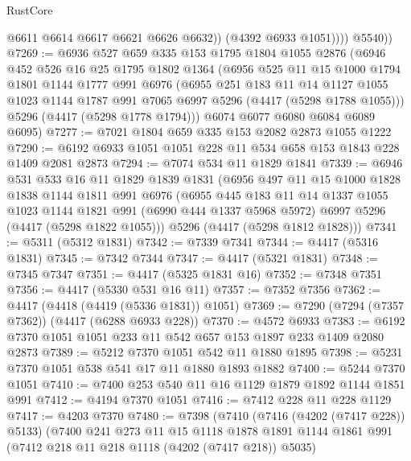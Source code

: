 \begin{lexlean}{RustCore}
\begin{coremodule}
                  @6611
                  @6614
                  @6617
                  @6621
                  @6626
                  @6632))
              (@4392 @6933 @1051))))
        @5540))
@7269 := @6936
    @527
    @659
    @335
    @153
    @1795
    @1804
    @1055
    @2876
    (@6946
      @452
      @526
      @16
      @25
      @1795
      @1802
      @1364
      (@6956
        @525
        @11
        @15
        @1000
        @1794
        @1801
        @1144
        @1777
        @991
        @6976
        (@6955
          @251
          @183
          @11
          @14
          @1127
          @1055
          @1023
          @1144
          @1787
          @991
          @7065
          @6997
          @5296
          (@4417 (@5298 @1788 @1055)))
        @5296
        (@4417 (@5298 @1778 @1794)))
      @6074
      @6077
      @6080
      @6084
      @6089
      @6095)
@7277 := @7021 @1804 @659 @335 @153 @2082 @2873 @1055 @1222
@7290 := @6192 @6933 @1051 @1051 @228 @11 @534 @658 @153 @1843 @228 @1409 @2081 @2873
@7294 := @7074 @534 @11 @1829 @1841
@7339 := @6946
    @531
    @533
    @16
    @11
    @1829
    @1839
    @1831
    (@6956
      @497
      @11
      @15
      @1000
      @1828
      @1838
      @1144
      @1811
      @991
      @6976
      (@6955
        @445
        @183
        @11
        @14
        @1337
        @1055
        @1023
        @1144
        @1821
        @991
        (@6990 @444 @1337 @5968 @5972)
        @6997
        @5296
        (@4417 (@5298 @1822 @1055)))
      @5296
      (@4417 (@5298 @1812 @1828)))
@7341 := @5311 (@5312 @1831)
@7342 := @7339 @7341
@7344 := @4417 (@5316 @1831)
@7345 := @7342 @7344
@7347 := @4417 (@5321 @1831)
@7348 := @7345 @7347
@7351 := @4417 (@5325 @1831 @16)
@7352 := @7348 @7351
@7356 := @4417 (@5330 @531 @16 @11)
@7357 := @7352 @7356
@7362 := @4417 (@4418 (@4419 (@5336 @1831)) @1051)
@7369 := @7290 (@7294 (@7357 @7362)) (@4417 (@6288 @6933 @228))
@7370 := @4572 @6933
@7383 := @6192 @7370 @1051 @1051 @233 @11 @542 @657 @153 @1897 @233 @1409 @2080 @2873
@7389 := @5212 @7370 @1051 @542 @11 @1880 @1895
@7398 := @5231 @7370 @1051 @538 @541 @17 @11 @1880 @1893 @1882
@7400 := @5244 @7370 @1051
@7410 := @7400 @253 @540 @11 @16 @1129 @1879 @1892 @1144 @1851 @991
@7412 := @4194 @7370 @1051
@7416 := @7412 @228 @11 @228 @1129
@7417 := @4203 @7370
@7480 := @7398
    (@7410
      (@7416 (@4202 (@7417 @228)) @5133)
      (@7400
        @241
        @273
        @11
        @15
        @1118
        @1878
        @1891
        @1144
        @1861
        @991
        (@7412 @218 @11 @218 @1118 (@4202 (@7417 @218)) @5035)

\end{coremodule}
\end{lexlean}
